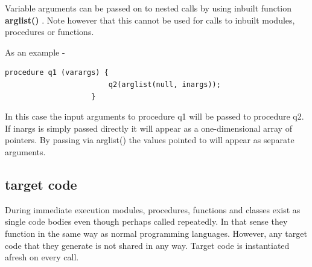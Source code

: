                 Variable arguments can be passed on to nested calls by using
                inbuilt function {\bf arglist()} .
                Note however that this cannot be used for calls to inbuilt modules,
                procedures or functions.
                
                As an example -
                \begin{lstlisting}[gobble=16, language=threepl]
                    procedure q1 (varargs) {
                        q2(arglist(null, inargs));
                    }
                \end{lstlisting}
                In this case the input arguments to procedure q1 will be passed
                to procedure q2. If inargs is simply passed directly it will
                appear as a one-dimensional array of pointers. By passing
                via arglist() the values pointed to will appear as separate arguments.
                

        \subsection{target code}

                During immediate execution modules, procedures, functions and
                classes exist as single code bodies even though perhaps called
                repeatedly. In that sense they function in the same way as normal
                programming languages. However, any target code that they generate
                is not shared in any way. Target code is instantiated afresh on
                every call.

